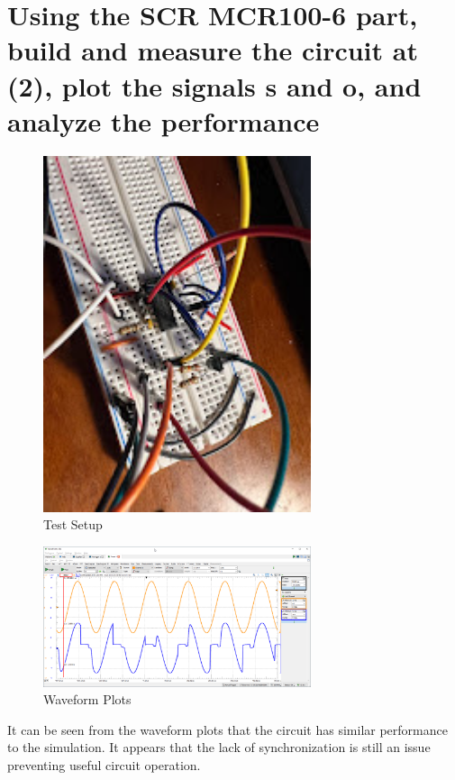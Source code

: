 \documentclass{article}
\begin{document}
	\section{Using the SCR MCR100-6 part, build and measure the circuit at (2), plot the signals s and o, and analyze the performance}
	
	\begin{figure}[H]
	    \centering
	    \includegraphics[width=0.7\textwidth]{4-setup}
	    \caption{Test Setup}
	\end{figure}
	
	\begin{figure}[H]
	    \centering
	    \includegraphics[width=0.7\textwidth]{4}
	    \caption{Waveform Plots}
	\end{figure}
	
	It can be seen from the waveform plots that the circuit has similar performance to the simulation. It appears that the lack of synchronization is still an issue preventing useful circuit operation. 
	
	
		
\end{document}
